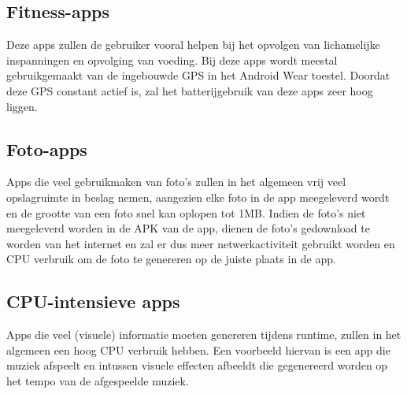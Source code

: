 \subsection{Fitness-apps}
Deze apps zullen de gebruiker vooral helpen bij het opvolgen van lichamelijke inspanningen en opvolging van voeding. Bij deze apps wordt meestal gebruikgemaakt van de ingebouwde GPS in het Android Wear toestel. Doordat deze GPS constant actief is, zal het batterijgebruik van deze apps zeer hoog liggen.
\subsection{Foto-apps}
Apps die veel gebruikmaken van foto's zullen in het algemeen vrij veel opslagruimte in beslag nemen, aangezien elke foto in de app meegeleverd wordt en de grootte van een foto snel kan oplopen tot 1MB. Indien de foto's niet meegeleverd worden in de APK van de app, dienen de foto's gedownload te worden van het internet en zal er dus meer netwerkactiviteit gebruikt worden en CPU verbruik om de foto te genereren op de juiste plaats in de app.
\subsection{CPU-intensieve apps}
Apps die veel (visuele) informatie moeten genereren tijdens runtime, zullen in het algemeen een hoog CPU verbruik hebben. Een voorbeeld hiervan is een app die muziek afspeelt en intussen visuele effecten afbeeldt die gegenereerd worden op het tempo van de afgespeelde muziek.  